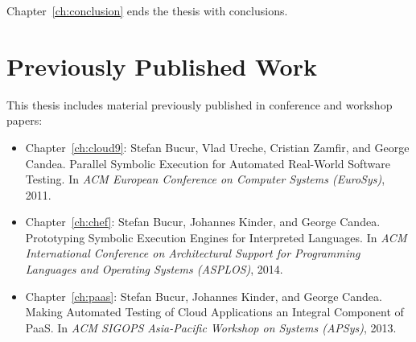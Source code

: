 Chapter~\ref{ch:conclusion} ends the thesis with conclusions.


\section{Previously Published Work}

This thesis includes material previously published in conference and workshop papers:

\begin{itemize}
\item Chapter~\ref{ch:cloud9}: Stefan Bucur, Vlad Ureche, Cristian Zamfir, and George Candea. Parallel Symbolic Execution for Automated Real-World Software Testing.  In \emph{ACM European Conference on Computer Systems (EuroSys)}, 2011.~\cite{cloud9}
\item Chapter~\ref{ch:chef}: Stefan Bucur, Johannes Kinder, and George Candea.  Prototyping Symbolic Execution Engines for Interpreted Languages.  In \emph{ACM International Conference on Architectural Support for Programming Languages and Operating Systems (ASPLOS)}, 2014.~\cite{chef-se}
\item Chapter~\ref{ch:paas}: Stefan Bucur, Johannes Kinder, and George Candea.  Making Automated Testing of Cloud Applications an Integral Component of PaaS.  In \emph{ACM SIGOPS Asia-Pacific Workshop on Systems (APSys)}, 2013.~\cite{paas-testing}
\end{itemize}

